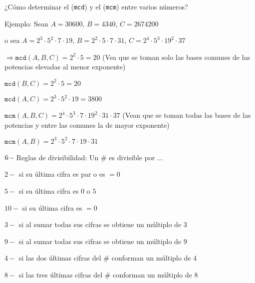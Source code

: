 ¿Cómo determinar el (\texttt{mcd}) y el (\texttt{mcm}) entre varios números?

Ejemplo: Sean $A=30600$, $B=4340$, $C=2674200$

\hspace{1.6cm}o sea $A=2^3\cdot5^2\cdot7\cdot19$, $B=2^2\cdot5\cdot7\cdot31$, $C=2^4\cdot5^3\cdot19^2\cdot37$

$\Longrightarrow \texttt{mcd}(A,B,C)=2^2\cdot5=20$ (Vea que se toman solo las bases comunes de las potencias elevadas al menor exponente)

\hspace{.8cm}$\texttt{mcd}(B,C)=2^2\cdot5=20$

\hspace{.8cm}$\texttt{mcd}(A,C)=2^3\cdot5^2\cdot19=3800$

\hspace{.8cm}$\texttt{mcm}(A,B,C)=2^4\cdot5^3\cdot7\cdot19^2\cdot31\cdot37$ (Vean que se toman todas las bases de las potencias y entre las comunes la de mayor exponente)

\hspace{.8cm}$\texttt{mcm}(A,B)=2^3\cdot5^2\cdot7\cdot19\cdot31$

\vspace{0.5cm}

$6\hspace{-0.05cm}\cdot\hspace{-0.05cm}\text{-}$ Reglas de divisibilidad: Un \# es divisible por ...

\hspace{.65cm}$2 -$ si su última cifra es par o es $= 0$

\hspace{.65cm}$5 -$ si su última cifra es $0$ o $5$

\hspace{.65cm}$10 -$ si su última cifra es $= 0$

\hspace{.65cm}$3 -$ si al sumar todas sus cifras se obtiene un múltiplo de $3$

\hspace{.65cm}$9 -$ si al sumar todas sus cifras se obtiene un múltiplo de $9$

\hspace{.65cm}$4 -$ si las dos últimas cifras del \# conforman un múltiplo de $4$

\hspace{.65cm}$8 -$ si las tres últimas cifras del \# conforman un múltiplo de $8$

\vspace{0.5cm}
